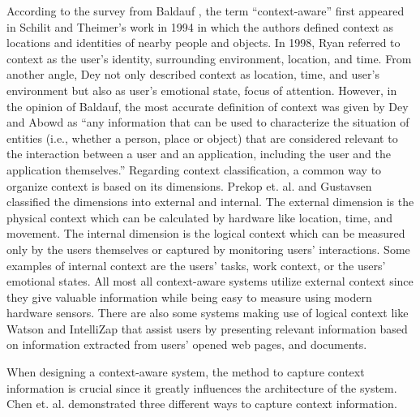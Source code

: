 According to the survey from Baldauf \cite{baldauf2007survey}, the term ``context-aware'' first appeared in Schilit and Theimer's work in 1994 \cite{schilit1994disseminating} in which the authors defined context as locations and identities of nearby people and objects. In 1998, Ryan \cite{ryan1998enhanced} referred to context as the user's identity, surrounding environment, location, and time. From another angle, Dey \cite{dey1998context} not only described context as location, time, and user's environment but also as user's emotional state, focus of attention. However, in the opinion of Baldauf, the most accurate definition of context was given by Dey and Abowd \cite{abowd1999towards} as ``any information that can be used to characterize the situation of entities (i.e., whether a person, place or object) that are considered relevant to the interaction between a user and an application, including the user and the application themselves.'' Regarding context classification, a common way to organize context is based on its dimensions. Prekop et. al. \cite{prekop2003activities} and Gustavsen \cite{gustavsen2002condor} classified the dimensions into external and internal. The external dimension is the physical context which can be calculated by hardware like location, time, and movement. The internal dimension is the logical context which can be measured only by the users themselves or captured by monitoring users' interactions. Some examples of internal context are the users' tasks, work context, or the users' emotional states. All most all context-aware systems utilize external context since they give valuable information while being easy to measure using modern hardware sensors. There are also some systems making use of logical context like Watson \cite{budzik2000user} and IntelliZap \cite{finkelstein2001placing} that assist users by presenting relevant information based on information extracted from users' opened web pages, and documents.

When designing a context-aware system, the method to capture context information is crucial since it greatly influences the architecture of the system. Chen et. al. \cite{chen2003ontology} demonstrated three different ways to capture context information.

